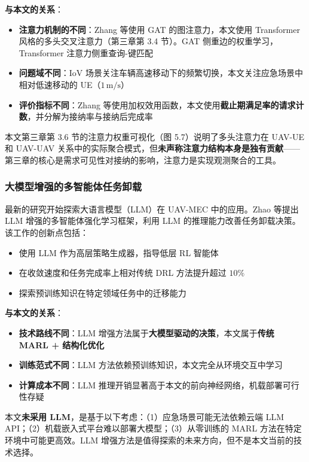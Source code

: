 \textbf{与本文的关系}：
\begin{itemize}
    \item \textbf{注意力机制的不同}：Zhang 等使用 GAT 的图注意力，本文使用 Transformer 风格的多头交叉注意力（第三章第 3.4 节）。GAT 侧重边的权重学习，Transformer 注意力侧重查询-键匹配
    \item \textbf{问题域不同}：IoV 场景关注车辆高速移动下的频繁切换，本文关注应急场景中相对低速移动的 UE（$1\,\mathrm{m/s}$）
    \item \textbf{评价指标不同}：Zhang 等使用加权效用函数，本文使用\textbf{截止期满足率的请求计数}，并分解为接纳率与接纳后完成率
\end{itemize}

本文第三章第 3.6 节的注意力权重可视化（图 5.7）说明了多头注意力在 UAV-UE 和 UAV-UAV 关系中的实际聚合模式，但\textbf{未声称注意力结构本身是独有贡献}——第三章的核心是需求可见性对接纳的影响，注意力是实现观测聚合的工具。

\subsubsection{大模型增强的多智能体任务卸载}

最新的研究开始探索大语言模型（LLM）在 UAV-MEC 中的应用。Zhao 等提出 LLM 增强的多智能体强化学习框架\cite{zhao2025llm}，利用 LLM 的推理能力改善任务卸载决策。该工作的创新点包括：
\begin{itemize}
    \item 使用 LLM 作为高层策略生成器，指导低层 RL 智能体
    \item 在收敛速度和任务完成率上相对传统 DRL 方法提升超过 $10\%$
    \item 探索预训练知识在特定领域任务中的迁移能力
\end{itemize}

\textbf{与本文的关系}：
\begin{itemize}
    \item \textbf{技术路线不同}：LLM 增强方法属于\textbf{大模型驱动的决策}，本文属于\textbf{传统 MARL + 结构化优化}
    \item \textbf{训练范式不同}：LLM 方法依赖预训练知识，本文完全从环境交互中学习
    \item \textbf{计算成本不同}：LLM 推理开销显著高于本文的前向神经网络，机载部署可行性存疑
\end{itemize}

本文\textbf{未采用 LLM}，是基于以下考虑：（1）应急场景可能无法依赖云端 LLM API；（2）机载嵌入式平台难以部署大模型；（3）从零训练的 MARL 方法在特定环境中可能更高效。LLM 增强方法是值得探索的未来方向，但不是本文当前的技术选择。

